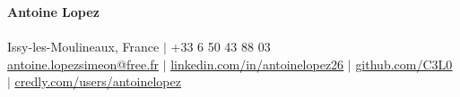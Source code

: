 \documentclass[letterpaper,10pt]{article}
\begin{document}
\begin{center}
    {\Huge \textbf{Antoine Lopez}} \\ \vspace{2pt}
    {\large \textbf{
    }} \\ \vspace{3pt}
    \small
    Issy-les-Moulineaux, France $|$ +33 6 50 43 88 03 \\
    \href{mailto:antoine.lopezsimeon@free.fr}{\underline{antoine.lopezsimeon@free.fr}} $|$ 
    \href{https://linkedin.com/in/antoinelopez26}{\underline{linkedin.com/in/antoinelopez26}} $|$
    \href{https://github.com/C3L0}{\underline{github.com/C3L0}} $|$
    \href{https://www.credly.com/users/antoinelopez26}{\underline{credly.com/users/antoinelopez}}
\end{center}

\vspace{-10pt}







\end{document}

